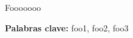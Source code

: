 \begin{resumen}
Fooooooo

\begin{flushleft}
\textbf{Palabras clave:} foo1, foo2, foo3
\end{flushleft}

\end{resumen}
